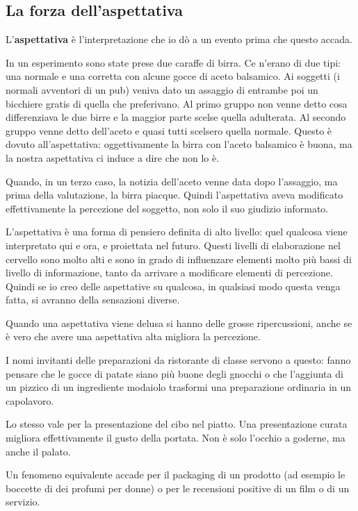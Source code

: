 \subsection{La forza dell'aspettativa}

L'\textbf{aspettativa} è l'interpretazione che io dò a un evento prima che
questo accada.

In un esperimento sono state prese due caraffe di birra. Ce n'erano di due
tipi: una normale e una corretta con alcune gocce di aceto balsamico.
Ai soggetti (i normali avventori di un pub) veniva dato un assaggio di
entrambe poi un bicchiere gratis di quella che preferivano.
Al primo gruppo non venne detto cosa differenziava le due birre e la maggior
parte scelse quella adulterata. Al secondo gruppo venne detto dell'aceto e
quasi tutti scelsero quella normale.
Questo è dovuto all'aspettativa: oggettivamente la birra con l'aceto balsamico
è buona, ma la nostra aspettativa ci induce a dire che non lo è.

Quando, in un terzo caso, la notizia dell'aceto venne data dopo l'assaggio, ma
prima della valutazione, la birra piacque.
Quindi l'aspettativa aveva modificato effettivamente la percezione del
soggetto, non solo il suo giudizio informato.

L'aspettativa è una forma di pensiero definita di alto livello: quel qualcosa
viene interpretato qui e ora, e proiettata nel futuro. Questi livelli di
elaborazione nel cervello sono molto alti e sono in grado di influenzare
elementi molto più bassi di livello di informazione, tanto da arrivare a
modificare elementi di percezione. Quindi se io creo delle aspettative su
qualcosa, in qualsiasi modo questa venga fatta, si avranno della sensazioni
diverse.

Quando una aspettativa viene delusa si hanno delle grosse ripercussioni, anche
se è vero che avere una aspettativa alta migliora la
percezione.

I nomi invitanti delle preparazioni da ristorante di classe servono a questo:
fanno pensare che le gocce di patate siano più buone degli gnocchi o che
l'aggiunta di un pizzico di un ingrediente modaiolo trasformi una preparazione
ordinaria in un capolavoro.

Lo stesso vale per la presentazione del cibo nel piatto.
Una presentazione curata migliora effettivamente il gusto della portata.
Non è solo l’occhio a goderne, ma anche il palato.

Un fenomeno equivalente accade per il packaging di un prodotto (ad esempio
le boccette di dei profumi per donne) o per le recensioni positive di un film
o di un servizio.

